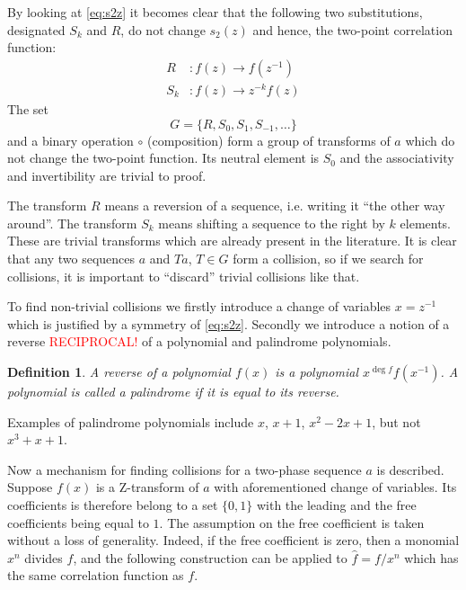 \documentclass[12pt, a4paper]{article}
\newtheorem{definition}{Definition}
\begin{document}
By looking at \cref{eq:s2z} it becomes clear that the following two
substitutions, designated $S_k$ and $R$, do not change $s_2(z)$ and hence, the
two-point correlation function:
\begin{equation}
  \begin{aligned}
    R&: f(z) \rightarrow f(z^{-1}) \\
    S_k&: f(z) \rightarrow z^{-k}f(z)
  \end{aligned}
  \label{eq:group-elts}
\end{equation}
The set
\begin{equation}
  G = \{R, S_0, S_1, S_{-1}, \dots \}
  \label{eq:group}
\end{equation}
and a binary operation $\circ$ (composition) form a group of transforms of $a$
which do not change the two-point function. Its neutral element is $S_0$ and the
associativity and invertibility are trivial to proof.

The transform $R$ means a reversion of a sequence, i.e. writing it ``the other
way around''. The transform $S_k$ means shifting a sequence to the right by $k$
elements. These are trivial transforms which are already present in the
literature. It is clear that any two sequences $a$ and $Ta$, $T \in G$ form a
collision, so if we search for collisions, it is important to ``discard''
trivial collisions like that.

To find non-trivial collisions we firstly introduce a change of variables
$x = z^{-1}$ which is justified by a symmetry of \cref{eq:s2z}. Secondly we
introduce a notion of a reverse \textcolor{red}{RECIPROCAL!} of a polynomial and palindrome polynomials.
\begin{definition}
  A reverse of a polynomial $f(x)$ is a polynomial $x^{\deg f}f(x^{-1})$. A
  polynomial is called a palindrome if it is equal to its reverse.
\end{definition}
Examples of palindrome polynomials include $x$, $x + 1$, $x^2 - 2x + 1$, but not
$x^3+x+1$.

Now a mechanism for finding collisions for a two-phase sequence $a$ is
described. Suppose $f(x)$ is a Z-transform of $a$ with aforementioned change of
variables. Its coefficients is therefore belong to a set $\{0, 1\}$ with the
leading and the free coefficients being equal to $1$. The assumption on the free
coefficient is taken without a loss of generality. Indeed, if the free
coefficient is zero, then a monomial $x^n$ divides $f$, and the following
construction can be applied to $\hat{f} = f / x^n$ which has the same
correlation function as $f$.
\end{document}
